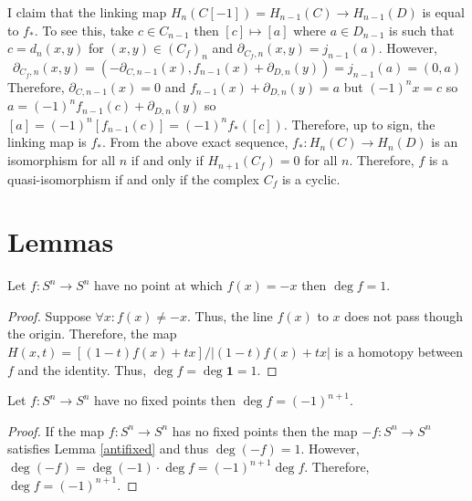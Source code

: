 \documentclass[12pt]{extarticle}
\begin{document}
\begin{center}
\end{center}
I claim that the linking map $H_{n}(C[-1]) = H_{n-1}(C) \to H_{n-1}(D)$ is equal to $f_*$. To see this, take $c \in C_{n-1}$ then $[c] \mapsto [a]$ where $a \in D_{n-1}$ is such that $c = d_{n}(x,y)$ for $(x,y) \in (C_f)_n$ and $\partial_{C_f, n} (x,y) = j_{n-1}(a)$. However, 
\[ \partial_{C_f, n} (x,y) = ( - \partial_{C,n-1} (x), f_{n-1}(x) + \partial_{D, n}(y)) = j_{n-1}(a) = (0, a) \]
Therefore, $\partial_{C,n-1}(x) = 0$ and $f_{n-1}(x) + \partial_{D,n}(y) = a$ but $(-1)^{n} x = c$ so $a = (-1)^n f_{n-1}(c) + \partial_{D,n}(y)$ so $[a] = (-1)^n [f_{n-1}(c)] = (-1)^n f_*([c])$. Therefore, up to sign, the linking map is $f_*$. From the above exact sequence, $f_* : H_n(C) \to H_n(D)$ is an isomorphism for all $n$ if and only if $H_{n+1}(C_f) = 0$ for all $n$. Therefore, $f$ is a quasi-isomorphism if and only if the complex $C_f$ is a cyclic. 

\section*{Lemmas}


\begin{lemma} \label{antifixed}
Let $f : S^n \to S^n$ have no point at which $f(x) = - x$ then $\deg{f} = 1$. 
\end{lemma}


\begin{proof}
Suppose $\forall x : f(x) \neq -x$. Thus, the line $f(x)$ to $x$ does not pass though the origin. Therefore, the map $H(x, t) = [(1 - t) f(x) + t x] / | (1 - t) f(x) + t x |$ is a homotopy between $f$ and the identity. Thus, $\deg{f} = \deg{\mathbf{1}} = 1$. 
\end{proof}

\begin{lemma} \label{fixed}
Let $f : S^n \to S^n$ have no fixed points then $\deg{f} = (-1)^{n+1}$. 
\end{lemma}

\begin{proof}
If the map $f : S^n \to S^n$ has no fixed points then the map $-f : S^n \to S^n$ satisfies Lemma \ref{antifixed} and thus $\deg{(-f)} = 1$. However, $\deg{(-f)} = \deg{(-1)} \cdot \deg{f} = (-1)^{n+1} \deg{f}$. Therefore, $\deg{f} = (-1)^{n+1}$.
\end{proof}
\end{document}
